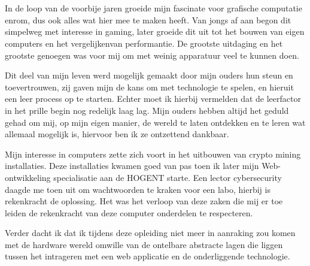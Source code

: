 
\chapter*{}%
\label{ch:voorwoord}


In de loop van de voorbije jaren groeide mijn fascinate voor grafische computatie enrom, dus ook alles wat hier mee te maken heeft. Van jongs af aan begon dit simpelweg met interesse in gaming, later groeide dit uit tot het bouwen van eigen computers en het vergelijkenvan performantie. De grootste uitdaging en het grootste genoegen was voor mij om met weinig apparatuur veel te kunnen doen. 

\bigbreak{}

Dit deel van mijn leven werd mogelijk gemaakt door mijn ouders hun steun en toevertrouwen, zij gaven mijn de kans om met technologie te spelen, en hieruit een leer process op te starten. Echter moet ik hierbij vermelden dat de leerfactor in het prille begin nog redelijk laag lag. Mijn ouders hebben altijd het geduld gehad om mij, op mijn eigen manier, de wereld te laten ontdekken en te leren wat allemaal mogelijk is, hiervoor ben ik ze ontzettend dankbaar.

\bigbreak{}

Mijn interesse in computers zette zich voort in het uitbouwen van crypto mining installaties. Deze installaties kwamen goed van pas toen ik later mijn Web-ontwikkeling specialisatie aan de HOGENT starte. Een lector cybersecurity daagde me toen uit om wachtwoorden te kraken voor een labo, hierbij is rekenkracht de oplossing. Het was het verloop van deze zaken die mij er toe leiden de rekenkracht van deze computer onderdelen te respecteren. 

\bigbreak{}

Verder dacht ik dat ik tijdens deze opleiding niet meer in aanraking zou komen met de hardware wereld omwille van de ontelbare abstracte lagen die liggen tussen het intrageren met een web applicatie en de onderliggende technologie.

